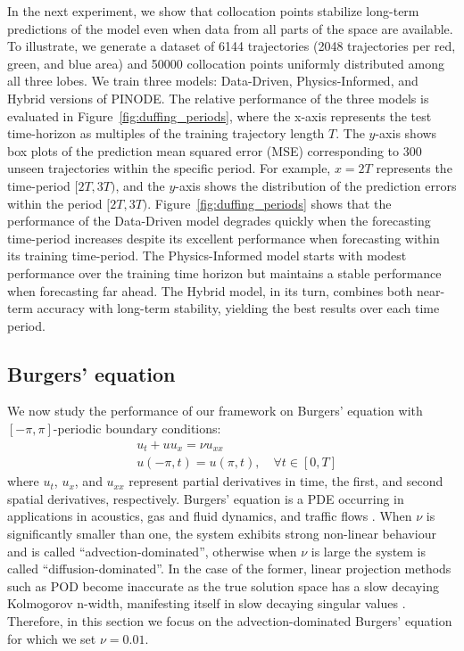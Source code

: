 In the next experiment, we show that collocation points stabilize long-term predictions of the model even when data from all parts of the space are available. To illustrate, we generate a dataset of 6144 trajectories (2048 trajectories per red, green, and blue area) and 50000 collocation points uniformly distributed among all three lobes. We train three models: Data-Driven, Physics-Informed, and Hybrid versions of PINODE. The relative performance of the three models is evaluated in Figure~\ref{fig:duffing_periods}, where the x-axis represents the test time-horizon as multiples of the training trajectory length $T$. The $y$-axis shows box plots of the prediction mean squared error (MSE) corresponding to 300 unseen trajectories within the specific period. For example, $x = 2T$ represents the time-period $[2T, 3T)$, and the $y$-axis shows the distribution of the prediction errors within the period $[2T, 3T)$. Figure~\ref{fig:duffing_periods} shows that the performance of the Data-Driven model degrades quickly when the forecasting time-period increases despite its excellent performance when forecasting within its training time-period. The Physics-Informed model starts with modest performance over the training time horizon but maintains a stable performance when forecasting far ahead. The Hybrid model, in its turn, combines both near-term accuracy with long-term stability, yielding the best results over each time period. 

\subsection{Burgers' equation}
\label{sec:burger_eqn}
We now study the performance of our framework on Burgers' equation with $[-\pi, \pi]$-periodic boundary conditions:
\begin{equation}
\begin{split}
\label{eq:burgers_equation}
    & u_t  + uu_x = \nu u_{xx} \\
    & u(-\pi, t) = u(\pi, t),\quad \forall t \in [0, T]
\end{split}
\end{equation}
where $u_t$, $u_x$, and $u_{xx}$ represent partial derivatives in time, the first, and second spatial derivatives, respectively. Burgers' equation is a PDE occurring in applications in acoustics, gas and fluid dynamics, and traffic flows \citep{burgers1948mathematical}. When $\nu$ is significantly smaller than one, the system exhibits strong non-linear behaviour and is called ``advection-dominated'', otherwise when $\nu$ is large the system is called ``diffusion-dominated''. 
In the case of the former, linear projection methods such as POD become inaccurate as the true solution space has a slow decaying Kolmogorov n-width, manifesting itself in slow decaying singular values \citep{peherstorfer2022breaking}. Therefore, in this section we focus on the advection-dominated Burgers' equation for which we set $\nu = 0.01$.


